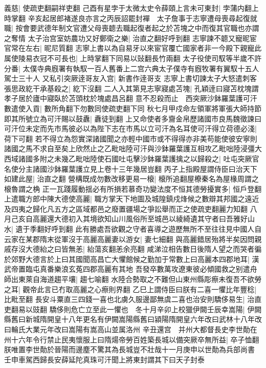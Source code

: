 義慈|{
	使疏吏翻嗣祥吏翻}
己酉有星孛于太微太史令薛頤上言未可東封|{
	孛蒲内翻上時掌翻}
辛亥起居郎褚遂良亦言之丙辰詔罷封襌　太子詹事于志寧遭母喪尋起復就職|{
	按會要武德年制文官遭父母喪聼去職起復者起之於苫塊之中而復其官職也亦謂之奪情}
太子治宫室妨農功又好鄭衛之樂|{
	治直之翻好呼到翻}
志寧諫不聼又寵昵宦官常在左右|{
	昵尼質翻}
志寧上書以為自易牙以來宦官覆亡國家者非一今殿下親寵此属使陵易衣冠不可長也|{
	上時掌翻下同易以䜴翻長竹兩翻}
太子役使司馭等半歲不許分番|{
	太僕寺典廐署有執馭一百人舊番上二宫六典太子僕寺有廐牧署有翼馭十五人駕士三十人}
又私引突厥逹哥友入宫|{
	新書作逹哥支}
志寧上書切諫太子大怒遣刺客張思政紇干承基殺之|{
	紇下沒翻}
二人入其第見志寧寢處苫塊|{
	孔穎逹曰寢苫枕塊謂孝子居於廬中寢臥於苫頭枕於塊處昌呂翻}
意不忍殺而止　西突厥沙鉢羅葉護可汗數遣使入貢|{
	數所角翻下勿數同使疏吏翻下同}
秋七月甲戍命左領軍將軍張大師持節即其所號立為可汗賜以鼓纛|{
	纛徒到翻}
上又命使者多齎金帛歷諸國市良馬魏徵諫曰可汗位未定而先市馬彼必以為陛下志在市馬以立可汗為名耳使可汗得立荷德必淺|{
	荷下可翻}
若不得立為怨實深諸國聞之亦輕中國市或不得得亦非美苟能使彼安寧則諸國之馬不求自至矣上欣然止之乙毗咄陸可汗與沙鉢羅葉護互相攻乙毗咄陸浸彊大西域諸國多附之未幾乙毗咄陸使石國吐屯擊沙鉢羅葉護擒之以歸殺之|{
	吐屯突厥官名使分主諸國沙鉢羅葉護立見上卷十三年幾居豈翻}
丙子上指殿屋謂侍臣曰治天下如建此屋|{
	治直之翻}
營構既成勿數改移更易一榱|{
	榱所追翻屋橑秦名為屋椽周謂之榱魯謂之桷}
正一瓦踐履動揺必有所損若慕奇功變法度不恒其德勞擾實多|{
	恒戶登翻}
上遣職方郎中陳大德使高麗|{
	職方掌天下地圖及城隍鎮戍烽候之數辯其邦國之遠近及四夷之歸化凡五方之區域都邑之廢置疆場之爭訟舉而正之使疏吏翻麗力知翻}
八月己亥自高麗還大德初入其境欲知山川風俗所至城邑以綾綺遺其守者曰吾雅好山水|{
	遺于季翻好呼到翻}
此有勝處吾欲觀之守者喜導之遊歷無所不至往往見中國人自云家在某郡隋末從軍沒于高麗高麗妻以游女|{
	妻七細翻}
與高麗錯居殆將半矣因問親戚存沒大德紿之曰皆無恙|{
	紿蕩亥翻恙余亮翻}
咸涕泣相告數日後隋人望之而哭者徧於郊野大德言於上曰其國聞高昌亡大懼館候之勤加于常數上曰高麗本四郡地耳|{
	漢武帝置臨屯真番樂浪玄菟四郡高麗有其地}
吾發卒數萬攻遼東彼必傾國救之别遣舟師出東萊自海道趨平壤|{
	趨七喻翻}
水陸合勢取之不難但山東州縣彫瘵未復吾不欲勞之耳|{
	觀帝此言已冇取高麗之心瘵則界翻}
乙巳上謂侍臣曰朕有二喜一懼比年豐稔|{
	比毗至翻}
長安斗粟直三四錢一喜也北虜久服邊鄙無虞二喜也治安則驕侈易生|{
	治直吏翻易以豉翻}
驕侈則危亡立至此一懼也　冬十月辛卯上校獵伊闕壬辰幸嵩陽|{
	伊闕縣舊曰新城隋開皇十八年更名有伊闕嵩陽縣舊曰潁陽隋開皇六年改曰武林十八年改曰輪氏大業元年改曰嵩陽有嵩高山並属洛州}
辛丑還宫　并州大都督長史李世勣在州十六年令行禁止民夷懷服上曰隋煬帝勞百姓築長城以備突厥卒無所益|{
	卒子恤翻}
朕唯置李世勣於晉陽而邊塵不驚其為長城豈不壯哉十一月庚申以世勣為兵部尚書　壬申車駕西歸長安薛延陀真珠可汗聞上將東封謂其下曰天子封泰

